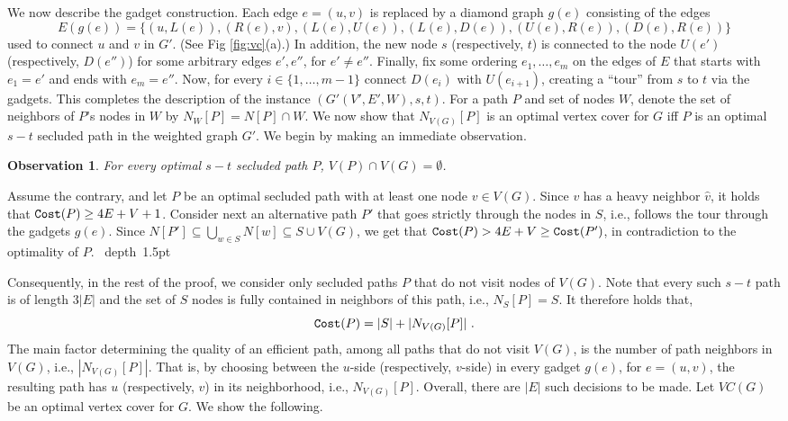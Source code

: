 \documentclass[12pt]{article}
\newtheorem{observation}[theorem]{Observation}
\def\Cost{\mbox{\tt Cost}}
\def\Proof{\par\noindent{\bf Proof:~}}
\def\blackslug{\hbox{\hskip 1pt \vrule width 4pt height 8pt
    depth 1.5pt \hskip 1pt}}
\def\QED{\quad\blackslug\lower 8.5pt\null\par}
\def\Cost{\mbox{\tt Cost}}
\begin{document}
We now describe the gadget construction. Each edge $e=(u,v)$ is replaced by a diamond graph $g(e)$ consisting of the edges $$E(g(e))=\{(u,L(e)), (R(e),v), (L(e), U(e)), (L(e), D(e)), (U(e), R(e)),(D(e), R(e)) \}$$ used to connect $u$ and $v$ in $G'$. (See Fig \ref{fig:vc}(a).) In addition, the new node $s$ (respectively, $t$)
is connected to the node $U(e')$ (respectively, $D(e'')$) for some arbitrary edges $e',e''$, for $e' \neq e''$.
Finally, fix some ordering $e_1, \ldots, e_{m}$ on the edges of $E$ that starts with $e_1=e'$ and ends with $e_m=e''$. Now, for every $i \in \{1, \ldots, m-1\}$ connect $D(e_{i})$ with $U(e_{i+1})$, creating a ``tour'' from $s$ to $t$ via the gadgets. This completes the description of the instance $(G'(V',E',W), s,t)$.
For a path $P$ and set of nodes $W$, denote the set of neighbors of $P$'s nodes in $W$ by
$N_W[P]=N[P] \cap W$.
We now show that $N_{V(G)}[P]$ is an optimal vertex cover for $G$ iff $P$ is
an optimal $s-t$ secluded path in the weighted graph $G'$.
We begin by making an immediate observation.
\begin{observation}
\label{obs:vc_pp}
For every optimal $s-t$ secluded path $P$, $V(P) \cap V(G) =\emptyset$.
\end{observation}
\Proof
Assume the contrary, and let $P$ be an optimal secluded path with at least one node $v \in V(G)$. Since $v$ has a heavy neighbor $\widehat{v}$, it holds that $\Cost(P) \geq 4E+V+1$.
Consider next an alternative path $P'$ that goes strictly through  the nodes in $S$, i.e., follows the tour through the gadgets $g(e)$. Since $N[P'] \subseteq \bigcup_{w \in S} N[w] \subseteq S \cup V(G)$, we get that $\Cost(P) > 4E+V \geq \Cost(P')$, in contradiction to the optimality of $P$.
\QED
Consequently, in the rest of the proof, we consider only secluded paths $P$ that do not visit nodes of $V(G)$. Note that every such $s-t$ path is of length $3|E|$ and the set of $S$ nodes is fully contained in neighbors of this path, i.e., $N_S[P]=S$. It therefore holds that,
\begin{equation}
\label{eq:p_notin_v}
\Cost(P)=|S|+|N_{V(G)}[P]|~.
\end{equation}
The main factor determining the quality of an efficient path, among all paths that do not visit $V(G)$, is the number of path neighbors in $V(G)$, i.e., $|N_{V(G)}[P]|$. That is, by choosing between the $u$-side (respectively, $v$-side) in every gadget $g(e)$, for $e=(u,v)$, the resulting path has $u$ (respectively, $v$) in its neighborhood, i.e., $N_{V(G)}[P]$. Overall, there are $|E|$ such decisions to be made. Let $VC(G)$ be an optimal vertex cover for $G$. We show the following.
\end{document}
